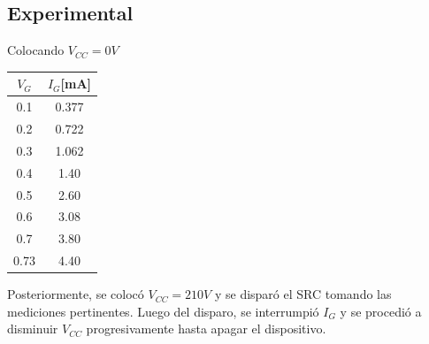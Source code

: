 \subsection{Experimental} %
Colocando $V_{CC}=0V$ 
\par 
\begin{minipage}{0.3\linewidth}
  \centering
  \begin{table}[H]
    \begin{center}
      \begin{tabular}{c|c}
        $V_{G}$ &$I_{G}$[mA]   \\
        \hline
        0.1   &0.377 \\
        0.2   &0.722 \\
        0.3   &1.062 \\
        0.4   &1.40  \\
        0.5   &2.60  \\
        0.6   &3.08  \\
        0.7   &3.80  \\
        0.73  &4.40  \\
      \end{tabular}
    \end{center} 
  \end{table}
\end{minipage}
\begin{minipage}{0.7\linewidth}
  \centering
\end{minipage}
Posteriormente, se colocó $V_{CC}=210V$ y se disparó el SRC tomando las mediciones pertinentes. 
Luego del disparo, se interrumpió $I_G$ y se procedió a disminuir $V_{CC}$ progresivamente hasta apagar el dispositivo.
\par
